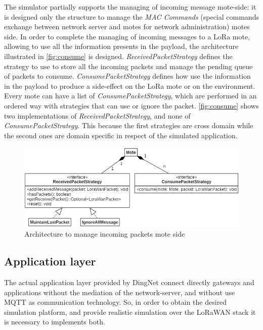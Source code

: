 The simulator partially supports the managing of incoming message mote-side: it is designed only the structure to manage the \textit{MAC Commands} (special commands exchange between network server and motes for network administration) motes side.
In order to complete the managing of incoming messages to a LoRa mote, allowing to use all the information presents in the payload, the architecture illustrated in \autoref{fig:consume} is designed.
\mbox{\textit{ReceivedPacketStrategy}} defines the strategy to use to store all the incoming packets and manage the pending queue of packets to consume.
\mbox{\textit{ConsumePacketStrategy}} defines how use the information in the payload to produce a side-effect on the LoRa mote or on the environment. 
Every mote can have a list of \mbox{\textit{ConsumePacketStrategy}}, which are performed in an ordered way with strategies that can use or ignore the packet.
\autoref{fig:consume} shows two implementations of \mbox{\textit{ReceivedPacketStrategy}}, and none of \mbox{\textit{ConsumePacketStrategy}}. This because the first strategies are cross domain while the second ones are domain specific in respect of the simulated application.
% 
\begin{figure}[h]
    \centering
    \includegraphics[width=\textwidth]{figures/consumePacket.png}
    \caption{Architecture to manage incoming packets mote side}
    \label{fig:consume}
\end{figure}
% 

\subsection*{Application layer}
The actual application layer provided by DingNet connect directly gateways and applications without the mediation of the network-server, and without use MQTT as communication technology.
So, in order to obtain the desired simulation platform, and provide realistic simulation over the LoRaWAN stack it is necessary to implements both.

